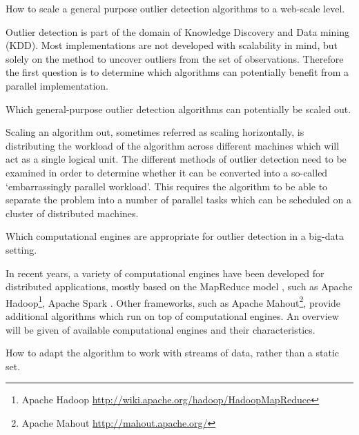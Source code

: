 \begin{research-question} 
How to scale a general purpose outlier detection algorithms to a web-scale level. \label{req1}
\end{research-question}   

Outlier detection is part of the domain of Knowledge Discovery and Data mining (KDD). Most implementations are not developed with scalability in mind, but solely on the method to uncover outliers from the set of observations. Therefore the first question is to determine which algorithms can potentially benefit from a parallel implementation.

\begin{research-sub-question} 
Which general-purpose outlier detection algorithms can potentially be scaled out. \label{sub-req1}
\end{research-sub-question}

Scaling an algorithm out, sometimes referred as scaling horizontally, is distributing the workload of the algorithm across different machines which will act as a single logical unit. The different methods of outlier detection need to be examined in order to determine whether it can be converted into a so-called `embarrassingly parallel workload'. This requires the algorithm to be able to separate the problem into a number of parallel tasks which can be scheduled on a cluster of distributed machines.

\begin{research-sub-question} 
Which computational engines are appropriate for outlier detection in a big-data setting. \label{sub-req2}
\end{research-sub-question}

In recent years, a variety of computational engines have been developed for distributed applications, mostly based on the MapReduce model \cite{Dean:2008:MSD:1327452.1327492}, such as Apache Hadoop\footnote{Apache Hadoop \url{http://wiki.apache.org/hadoop/HadoopMapReduce}}, Apache Spark \cite{Zaharia:2010:SCC:1863103.1863113}. Other frameworks, such as Apache Mahout\footnote{Apache Mahout \url{http://mahout.apache.org/}}, provide additional algorithms which run on top of computational engines. An overview will be given of available computational engines and their characteristics.


\begin{research-sub-question} 
How to adapt the algorithm to work with streams of data, rather than a static set. \label{sub-req3}
\end{research-sub-question}

